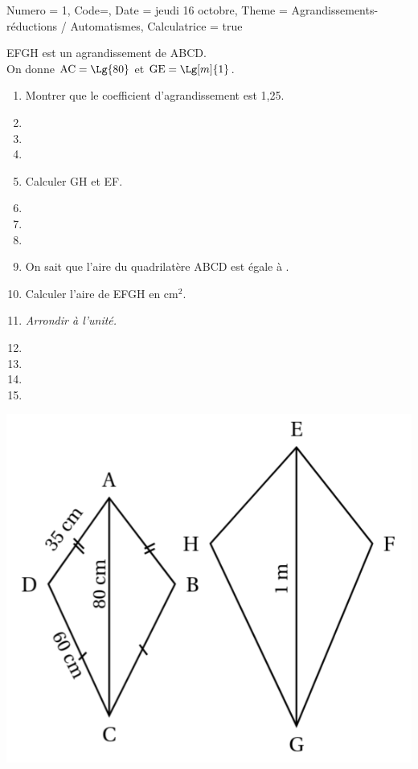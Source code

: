 \documentclass[11pt]{article}
\newcommand{\ligne}{{\color{gray!60}\hrulefill}}
\begin{document}
\begin{Maquette}[IE]{
        Numero = 1, Code={}, Date = jeudi 16 octobre, Theme = Agrandissements-réductions / Automatismes, Calculatrice = true
    }
    \begin{exercice}
        \begin{multicols}{2}
            EFGH est un agrandissement de ABCD.\\
            On donne $\textrm{AC} = \Lg{80}$ et $\textrm{GE} = \Lg[m]{1}$.
            \begin{enumerate}
                \item Montrer que le coefficient d’agrandissement est 1,25.
                \item[] \ligne
                \item[] \ligne
                \item[] \ligne
                \item Calculer GH et EF.
                \item[] \ligne
                \item[] \ligne
                \item[] \ligne
                \item On sait que l’aire du quadrilatère ABCD est égale à .
                \item[] Calculer l’aire de EFGH en $\textrm{cm}^2$.
                \item[] \emph{Arrondir à l’unité.}
                \item[] \ligne
                \item[] \ligne
                \item[] \ligne
                \item[] \ligne

            \end{enumerate}

            \columnbreak
            \begin{center}
                \includegraphics[width=.9\linewidth]{Images/Évaluation 2 - ex DNB.png}


\end{center}
\end{multicols}
\end{exercice}
\end{Maquette}
\end{document}
